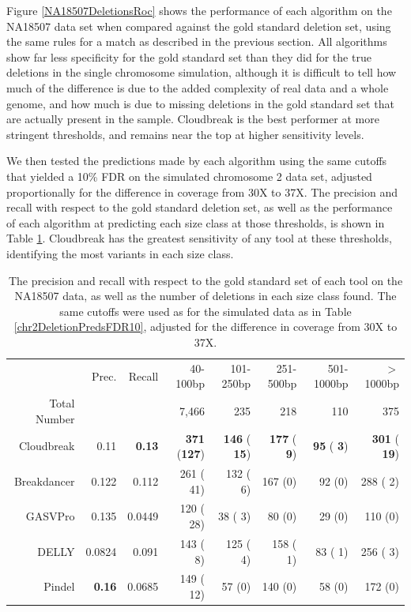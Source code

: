 \documentclass[11pt]{article}
\begin{document}
Figure \ref{NA18507DeletionsRoc} shows the performance of each algorithm on the NA18507 data set when compared against the gold standard deletion set, using the same rules for a match as described in the previous section. All algorithms show far less specificity for the gold standard set than they did for the true deletions in the single chromosome simulation, although it is difficult to tell how much of the difference is due to the added complexity of real data and a whole genome, and how much is due to missing deletions in the gold standard set that are actually present in the sample. Cloudbreak is the best performer at more stringent thresholds, and remains near the top at higher sensitivity levels.

We then tested the predictions made by each algorithm using the same cutoffs that yielded a 10\% FDR on the simulated chromosome 2 data set, adjusted proportionally for the difference in coverage from 30X to 37X. The precision and recall with respect to the gold standard deletion set, as well as the performance of each algorithm at predicting each size class at those thresholds, is shown in Table \ref{NA18507DeletionPreds}. Cloudbreak has the greatest sensitivity of any tool at these thresholds, identifying the most variants in each size class.

\begin{table}
\begin{center}
\begin{tabular}{rrr|rrrrr}
  \hline
 & Prec. & Recall & 40-100bp & 101-250bp & 251-500bp & 501-1000bp & $>$ 1000bp \\ 
Total Number & & & 7,466 & 235 & 218 & 110 & 375 \\
  \hline
Cloudbreak & 0.11 & \textbf{0.13} & \textbf{371} (\textbf{127})  & \textbf{146} (\textbf{ 15}) &  \textbf{177} (\textbf{  9}) & \textbf{ 95} (\textbf{  3}) & \textbf{301} (\textbf{ 19}) \\ 
Breakdancer & 0.122 & 0.112 & 261 ( 41)  & 132 (  6) &  167 (0) &  92 (0) & 288 (  2) \\  
  GASVPro & 0.135 & 0.0449 & 120 ( 28)  &  38 (  3) &   80 (0) &  29 (0) & 110 (0) \\ 
  DELLY & 0.0824 & 0.091 & 143 (  8)  & 125 (  4) &  158 (  1) &  83 (  1) & 256 (  3) \\ 
  Pindel & \textbf{0.16} & 0.0685 & 149 ( 12)  &  57 (0) &  140 (0) &  58 (0) & 172 (0) \\ 
   \hline
\end{tabular}
\end{center}
\caption{The precision and recall with respect to the gold standard set of each tool on the NA18507 data, as well as the number of deletions in each size class found. The same cutoffs were used as for the simulated data as in Table \ref{chr2DeletionPredsFDR10}, adjusted for the difference in coverage from 30X to 37X.}
\label{NA18507DeletionPreds}
\end{table}
\end{document}
